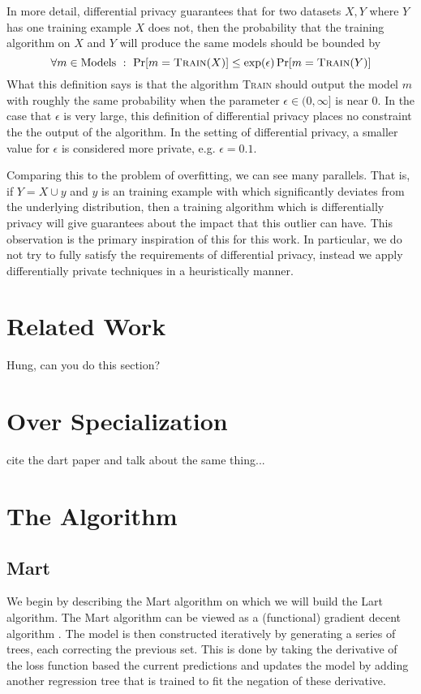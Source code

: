 \documentclass{article} %
\begin{document}
In more detail, differential privacy guarantees that for two datasets $X,Y$ where $Y$ has one training example $X$ does not, then the probability that the training algorithm on $X$ and $Y$ will produce the same models should be bounded by
$$
	\forall m \in\mbox{Models} \ : \ \Pr[m = \textsc{Train}(X)] \leq \exp(\epsilon) \Pr[m= \textsc{Train}(Y)]
$$
What this definition says is that the algorithm \textsc{Train} should output the model $m$ with roughly the same probability when the parameter $\epsilon\in (0,\infty]$ is near $0$. In the case that $\epsilon$ is very large, this definition of differential privacy places no constraint the the output of the algorithm. In the setting of differential privacy, a smaller value for $\epsilon$ is considered more private, e.g. $\epsilon=0.1$. 

Comparing this to the problem of overfitting, we can see many parallels. That is, if $Y = X \cup {y}$ and $y$ is an training example with which significantly deviates from the underlying distribution, then a training algorithm which is differentially privacy will give guarantees about the impact that this outlier can have. This observation is the primary inspiration of this for this work. In particular, we do not try to fully satisfy the requirements of differential privacy, instead we apply differentially private techniques in a heuristically manner.

\section{Related Work}    
 
Hung, can you do this section?

\section{Over Specialization}

cite the dart paper and talk about the same thing...

\section{The Algorithm}

\subsection{Mart}
We begin by describing the Mart algorithm on which we will build the Lart algorithm. The Mart algorithm can be viewed as a (functional) gradient decent algorithm \cite{friedman2001}. The model is then constructed iteratively by generating a series of trees, each correcting the previous set. This is done by taking the derivative of the loss function based the current predictions and updates the model by adding another regression tree that is trained to fit the negation of these derivative. 
\end{document}
